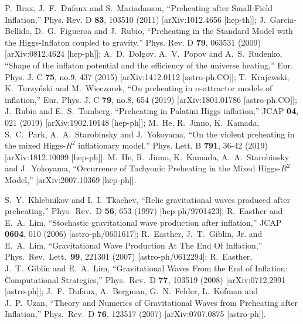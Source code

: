 \documentclass[%
aps,prd,nofootinbib,showkeys,a4paper,10pt
]{revtex4-2}
\begin{document}
\begin{thebibliography}{10}
P.~Brax, J.~F.~Dufaux and S.~Mariadassou,
``Preheating after Small-Field Inflation,''
Phys. Rev. D \textbf{83}, 103510 (2011)
[arXiv:1012.4656 [hep-th]];
J.~Garcia-Bellido, D.~G.~Figueroa and J.~Rubio,
``Preheating in the Standard Model with the Higgs-Inflaton coupled to gravity,''
Phys. Rev. D \textbf{79}, 063531 (2009)
[arXiv:0812.4624 [hep-ph]];
A.~D.~Dolgov, A.~V.~Popov and A.~S.~Rudenko,
``Shape of the inflaton potential and the efficiency of the universe heating,''
Eur. Phys. J. C \textbf{75}, no.9, 437 (2015)
[arXiv:1412.0112 [astro-ph.CO]];
T.~Krajewski, K.~Turzy\'nski and M.~Wieczorek,
``On preheating in $\alpha$-attractor models of inflation,''
Eur. Phys. J. C \textbf{79}, no.8, 654 (2019)
[arXiv:1801.01786 [astro-ph.CO]];
J.~Rubio and E.~S.~Tomberg,
``Preheating in Palatini Higgs inflation,''
JCAP \textbf{04}, 021 (2019)
[arXiv:1902.10148 [hep-ph]];
M.~He, R.~Jinno, K.~Kamada, S.~C.~Park, A.~A.~Starobinsky and J.~Yokoyama,
``On the violent preheating in the mixed Higgs-$R^2$ inflationary model,''
Phys. Lett. B \textbf{791}, 36-42 (2019)
[arXiv:1812.10099 [hep-ph]].
M.~He, R.~Jinno, K.~Kamada, A.~A.~Starobinsky and J.~Yokoyama,
``Occurrence of Tachyonic Preheating in the Mixed Higgs-$R^2$ Model,''
[arXiv:2007.10369 [hep-ph]].






S.~Y.~Khlebnikov and I.~I.~Tkachev,
``Relic gravitational waves produced after preheating,''
Phys.\ Rev.\ D {\bf 56}, 653 (1997)
[hep-ph/9701423];
R.~Easther and E.~A.~Lim,
``Stochastic gravitational wave production after inflation,''
JCAP {\bf 0604}, 010 (2006)
[astro-ph/0601617];
R.~Easther, J.~T.~Giblin, Jr. and E.~A.~Lim,
``Gravitational Wave Production At The End Of Inflation,''
Phys.\ Rev.\ Lett.\  {\bf 99}, 221301 (2007)
[astro-ph/0612294];
R.~Easther, J.~T.~Giblin and E.~A.~Lim,
``Gravitational Waves From the End of Inflation: Computational Strategies,''
Phys.\ Rev.\ D {\bf 77}, 103519 (2008)
[arXiv:0712.2991 [astro-ph]];
J.~F.~Dufaux, A.~Bergman, G.~N.~Felder, L.~Kofman and J.~P.~Uzan,
``Theory and Numerics of Gravitational Waves from Preheating after Inflation,''
Phys.\ Rev.\ D {\bf 76}, 123517 (2007)
[arXiv:0707.0875 [astro-ph]].




\end{thebibliography}
\end{document}

